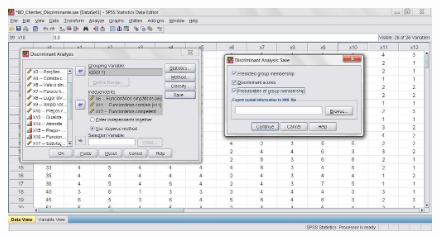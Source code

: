 			\begin{figure}[H]
				\centering
				\includegraphics[height=8cm]{images/analise-discriminante_passo-a-passo_7}
			\end{figure}